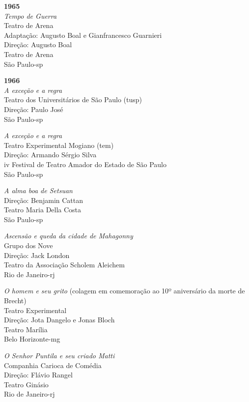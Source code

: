 {\item{\bf 1965}\\
{\it Tempo de Guerra}\\
Teatro de Arena\\
Adaptação: Augusto Boal e Gianfrancesco Guarnieri\\
Direção: Augusto Boal\\
Teatro de Arena\\
São Paulo-{\sc sp}

\item{\bf 1966}\\
{\it A exceção e a regra}\\
Teatro dos Universitários de São Paulo ({\sc tusp})\\
Direção: Paulo José\\
São Paulo-{\sc sp}

{\it A exceção e a regra}\\
Teatro Experimental Mogiano ({\sc tem})\\
Direção: Armando Sérgio Silva\\
{\sc iv} Festival de Teatro Amador do Estado de São Paulo\\
São Paulo-{\sc sp}

{\it A alma boa de Setsuan}\\
Direção: Benjamin Cattan\\
Teatro Maria Della Costa\\
São Paulo-{\sc sp}

{\it Ascensão e queda da cidade de Mahagonny}\\
Grupo dos Nove\\
Direção: Jack London\\
Teatro da Associação Scholem Aleichem\\
Rio de Janeiro-{\sc rj}

{\it O homem e seu grito} (colagem em comemoração ao 10º aniversário da
morte de Brecht)\\
Teatro Experimental\\
Direção: Jota Dangelo e Jonas Bloch\\
Teatro Marília\\
Belo Horizonte-{\sc mg}

{\it O Senhor Puntila e seu criado Matti}\\
Companhia Carioca de Comédia\\
Direção: Flávio Rangel\\
Teatro Ginásio\\
Rio de Janeiro-{\sc rj}

}

